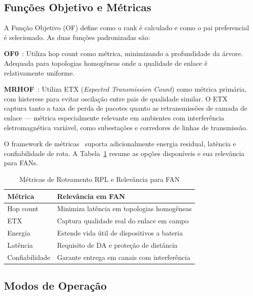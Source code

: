 \documentclass[conference]{IEEEtran}
\begin{document}
\subsection{Funções Objetivo e Métricas}

A Função Objetivo (OF) define como o rank é calculado e como o pai preferencial
é selecionado. As duas funções padronizadas são:

\textbf{OF0}~\cite{rfc6552}: Utiliza hop count como métrica, minimizando a
profundidade da árvore. Adequada para topologias homogêneas onde a qualidade
de enlace é relativamente uniforme.

\textbf{MRHOF}~\cite{rfc6719}: Utiliza ETX (\textit{Expected Transmission
Count}) como métrica primária, com histerese para evitar oscilação entre pais
de qualidade similar. O ETX captura tanto a taxa de perda de pacotes quanto as
retransmissões de camada de enlace --- métrica especialmente relevante em
ambientes com interferência eletromagnética variável, como subestações e
corredores de linhas de transmissão.

O framework de métricas~\cite{rfc6551} suporta adicionalmente energia residual,
latência e confiabilidade de rota. A Tabela~\ref{tab:metrics} resume as opções
disponíveis e sua relevância para FANs.

\begin{table}[t]
  \caption{Métricas de Roteamento RPL e Relevância para FAN}
  \label{tab:metrics}
  \centering
  \begin{tabularx}{\columnwidth}{lX}
    \toprule
    \textbf{Métrica} & \textbf{Relevância em FAN} \\
    \midrule
    Hop count    & Minimiza latência em topologias homogêneas \\
    ETX          & Captura qualidade real do enlace em campo \\
    Energia      & Estende vida útil de dispositivos a bateria \\
    Latência     & Requisito de DA e proteção de distância \\
    Confiabilidade & Garante entrega em canais com interferência \\
    \bottomrule
  \end{tabularx}
\end{table}

\subsection{Modos de Operação}
\end{document}
